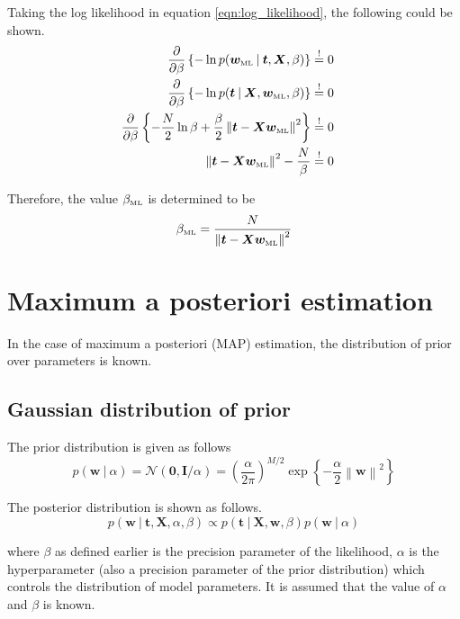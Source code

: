 \documentclass[11pt]{article}
\newcommand{\eye}{\bm{I}}
\newcommand{\mle}[1]{{#1}_{\text{\tiny ML}}}
\newcommand\given[1][]{\:#1\vert\:}
\newcommand{\norm}[1]{\left\lVert#1\right\rVert}
\begin{document}
Taking the log likelihood in equation \ref{eqn:log_likelihood}, the following could be shown.
\begin{eqnarray}
    \frac{\partial }{\partial  \beta} \left\{ -\ln{p(\mle{\bm{w}} \given \bm{t}, \bm{X}, \beta)} \right\} 
    &\overset{!}{=} 0& \\
    \frac{\partial }{\partial  \beta} \left\{ -\ln{p(\bm{t} \given \bm{X}, \mle{\bm{w}}, \beta)} \right\} 
    &\overset{!}{=} 0& \\
    \frac{\partial }{\partial \beta} \left\{-\frac{N}{2}\ln{\beta} + \frac{\beta}{2} \norm{\bm{t} - \bm{X}\mle{\bm{w}}}^2  \right\}
    &\overset{!}{=} 0& \\
    \norm{\bm{t} - \bm{X} \mle{\bm{w}}}^2 - \frac{N}{\beta}
    &\overset{!}{=} 0& 
\end{eqnarray}

Therefore, the value $\mle{\beta}$ is determined to be 
\begin{equation} \label{eqn:beta_ML}
    \mle{\beta} = \frac{N}{\norm{\bm{t} - \bm{X}\mle{\bm{w}}}^2}
\end{equation}

\section{Maximum a posteriori estimation}

In the case of maximum a posteriori (MAP) estimation, the distribution of prior over parameters is known. 

\subsection{Gaussian distribution of prior}

The prior distribution is given as follows
\begin{equation} \label{prior_alpha}
    p(\bm{w} \given \alpha) = \mathcal N(\bm 0, \eye /\alpha) = \left( \frac{\alpha}{2\pi}\right)^{M/2} \exp{\left\{ -\frac{\alpha}{2}\norm{\bm{w}}^2\right\}}
\end{equation}

The posterior distribution is shown as follows.
\begin{equation}
    p(\bm{w} \given \bm{t}, \bm{X}, \alpha, \beta) \propto p(\bm{t} \given \bm{X}, \bm{w}, \beta) p(\bm{w} \given \alpha)
\end{equation}

where $\beta$ as defined earlier is the precision parameter of the likelihood, $\alpha$ is the hyperparameter (also a precision parameter of the prior distribution) which controls the distribution of model parameters. It is assumed that the value of $\alpha$ and $\beta$ is known.
\end{document}
